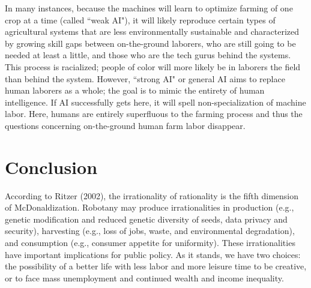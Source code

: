 In many instances, because the machines will learn to optimize farming of one crop at a time (called ``weak AI"), it will likely reproduce certain types of agricultural systems that are less environmentally sustainable and characterized by growing skill gaps between on-the-ground laborers, who are still going to be needed at least a little, and those who are the tech gurus behind the systems. This process is racialized; people of color will more likely be in laborers the field than behind the system. However, ``strong AI" or general AI aims to replace human laborers as a whole; the goal is to mimic the entirety of human intelligence. If AI successfully gets here, it will spell non-specialization of machine labor. Here, humans are entirely superfluous to the farming process and thus the questions concerning on-the-ground human farm labor disappear. 

\section{Conclusion} 
According to Ritzer (2002), the irrationality of rationality is the fifth dimension of McDonaldization. Robotany may produce irrationalities in production (e.g., genetic modification and reduced genetic diversity of seeds, data privacy and security), harvesting (e.g., loss of jobs, waste, and environmental degradation), and consumption (e.g., consumer appetite for uniformity). These irrationalities have important implications for public policy. As it stands, we have two choices: the possibility of a better life with less labor and more leisure time to be creative, or to face mass unemployment and continued wealth and income inequality.





